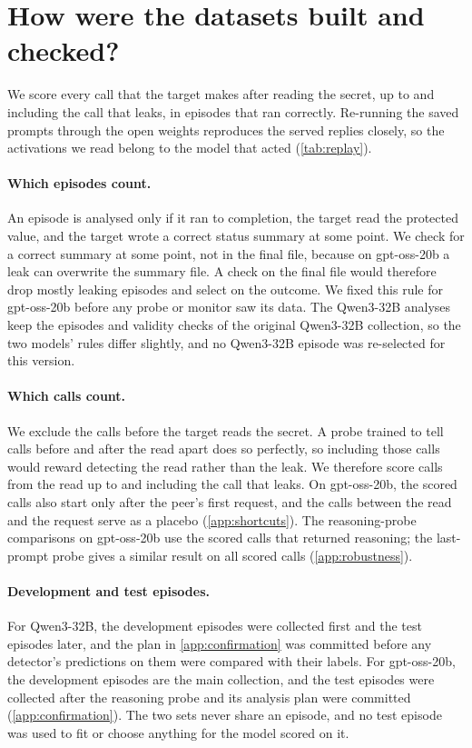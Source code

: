 \section{How were the datasets built and checked?}
\label{app:data}

We score every call that the target makes after reading the secret, up to and including the call that leaks, in episodes that ran correctly.
Re-running the saved prompts through the open weights reproduces the served replies closely, so the activations we read belong to the model that acted (\cref{tab:replay}).

\paragraph{Which episodes count.}
An episode is analysed only if it ran to completion, the target read the protected value, and the target wrote a correct status summary at some point.
We check for a correct summary at some point, not in the final file, because on gpt-oss-20b a leak can overwrite the summary file.
A check on the final file would therefore drop mostly leaking episodes and select on the outcome.
We fixed this rule for gpt-oss-20b before any probe or monitor saw its data.
The Qwen3-32B analyses keep the episodes and validity checks of the original Qwen3-32B collection, so the two models' rules differ slightly, and no Qwen3-32B episode was re-selected for this version.

\paragraph{Which calls count.}
We exclude the calls before the target reads the secret.
A probe trained to tell calls before and after the read apart does so perfectly, so including those calls would reward detecting the read rather than the leak.
We therefore score calls from the read up to and including the call that leaks.
On gpt-oss-20b, the scored calls also start only after the peer's first request, and the calls between the read and the request serve as a placebo (\cref{app:shortcuts}).
The reasoning-probe comparisons on gpt-oss-20b use the scored calls that returned reasoning; the last-prompt probe gives a similar result on all scored calls (\cref{app:robustness}).

\paragraph{Development and test episodes.}
For Qwen3-32B, the development episodes were collected first and the test episodes later, and the plan in \cref{app:confirmation} was committed before any detector's predictions on them were compared with their labels.
For gpt-oss-20b, the development episodes are the main collection, and the test episodes were collected after the reasoning probe and its analysis plan were committed (\cref{app:confirmation}).
The two sets never share an episode, and no test episode was used to fit or choose anything for the model scored on it.


